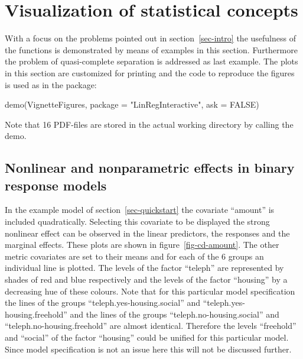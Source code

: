 \documentclass[nojss]{jss}
\newcommand{\quotes}[1]{``#1''}
\begin{document}
\section{Visualization of statistical concepts} \label{sec-visualization}
With a focus on the problems pointed out in section~\ref{sec-intro} the usefulness of the functions is demonstrated by means of examples in this section. Furthermore the problem of quasi-complete separation is addressed as last example. The plots in this section are customized for printing and the code to reproduce the figures is used as  in the package:
%
\begin{Schunk}
\begin{Sinput}
 demo(VignetteFigures, package = "LinRegInteractive", ask = FALSE)
\end{Sinput}
\end{Schunk}
%
Note that 16 PDF-files are stored in the actual working directory by calling the demo.

\subsection{Nonlinear and nonparametric effects in binary response models}
In the example model of section~\ref{sec-quickstart} the covariate \quotes{amount} is included quadratically. 
Selecting this covariate to be displayed the strong nonlinear effect can be observed in the linear predictors, the responses and the marginal
effects. These  plots are shown in figure~\ref{fig-cd-amount}. The other metric covariates are set to their means and for each of the 6 groups an individual line is plotted. The levels of the factor \quotes{teleph} are represented by shades of red and blue respectively and the levels of the factor \quotes{housing} by a decreasing hue of these colours.  Note that for this particular model specification the lines of the groups \quotes{teleph.yes-housing.social} and \quotes{teleph.yes-housing.freehold} and the lines of the groups \quotes{teleph.no-housing.social} and \quotes{teleph.no-housing.freehold} are almost identical. Therefore the levels \quotes{freehold} and \quotes{social} of the factor \quotes{housing} could be unified for this particular model. Since model specification is not an issue here this will not be discussed further.  
\end{document}
